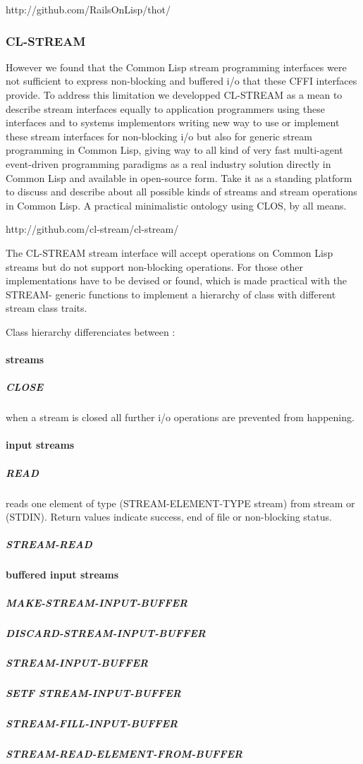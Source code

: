 \documentclass[sigconf]{acmart}
\begin{document}
http://github.com/RailsOnLisp/thot/


\subsubsection{CL-STREAM}
However we found that the Common Lisp stream programming interfaces
were not sufficient to express non-blocking and buffered i/o that
these CFFI interfaces provide. To address this limitation we
developped CL-STREAM as a mean to describe stream interfaces equally
to application programmers using these interfaces and to systems
implementors writing new way to use or implement these stream
interfaces for non-blocking i/o but also for generic stream
programming in Common Lisp, giving way to all kind of very fast
multi-agent event-driven programming paradigms as a real industry
solution directly in Common Lisp and available in open-source
form. Take it as a standing platform to discuss and describe about all
possible kinds of streams and stream operations in Common Lisp. A
practical minimalistic ontology using CLOS, by all means.

http://github.com/cl-stream/cl-stream/

The CL-STREAM stream interface will accept operations on Common Lisp
streams but do not support non-blocking operations. For those other
implementations have to be devised or found, which is made practical
with the STREAM- generic functions to implement a hierarchy of class
with different stream class traits.

Class hierarchy differenciates between :

\paragraph{streams}
\subparagraph{CLOSE}
when a stream is closed all further i/o operations are prevented from
happening.

\paragraph{input streams}
\subparagraph{READ}
reads one element of type (STREAM-ELEMENT-TYPE stream) from stream or
(STDIN). Return values indicate success, end of file or non-blocking
status.
\subparagraph{STREAM-READ}

\paragraph{buffered input streams}
\subparagraph{MAKE-STREAM-INPUT-BUFFER}
\subparagraph{DISCARD-STREAM-INPUT-BUFFER}
\subparagraph{STREAM-INPUT-BUFFER}
\subparagraph{SETF STREAM-INPUT-BUFFER}
\subparagraph{STREAM-FILL-INPUT-BUFFER}
\subparagraph{STREAM-READ-ELEMENT-FROM-BUFFER}
\end{document}
